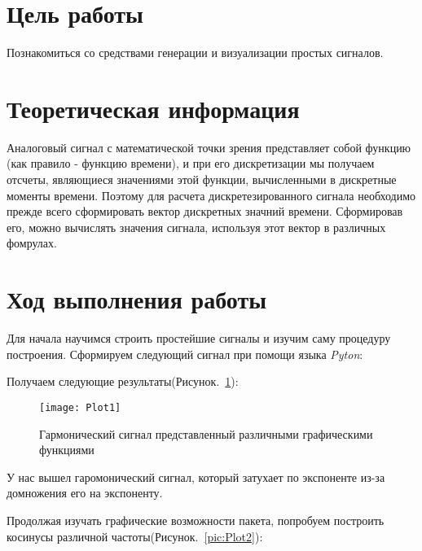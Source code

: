 








\section{Цель работы}
Познакомиться со средствами генерации и визуализации простых сигналов.


\section{Теоретическая информация}
Аналоговый сигнал с математической точки зрения представляет собой функцию (как правило - функцию времени), и при его дискретизации мы получаем отсчеты, являющиеся значениями этой функции, вычисленными в дискретные моменты времени. Поэтому для расчета дискретезированного сигнала необходимо прежде всего сформировать вектор дискретных значний времени. Сформировав его, можно вычислять значения сигнала, используя этот вектор в различных фомрулах.

\section{Ход выполнения работы}
Для начала научимся строить простейшие сигналы и изучим саму процедуру построения. Сформируем следующий сигнал при помощи языка \textit{Pyton}:



\parindent=1cm %

Получаем следующие результаты(Рисунок.~\ref{pic:Plot1}):

\begin{figure}[H]
	\begin{center}
		\texttt{[image: Plot1]}
		\caption{Гармонический сигнал представленный различными графическими функциями} 
		\label{pic:Plot1} %
	\end{center}
\end{figure}

У нас вышел  гаромонический сигнал, который затухает по экспоненте из-за домножения его на экспоненту.

Продолжая изучать графические возможности пакета, попробуем построить косинусы различной частоты(Рисунок.~\ref{pic:Plot2}):

